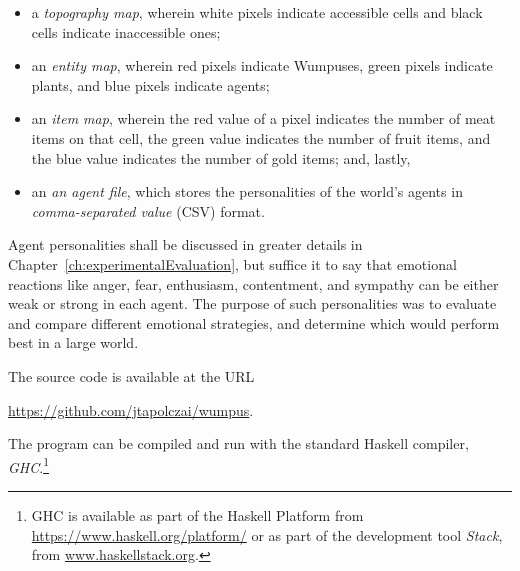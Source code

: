 \begin{itemize}
	\item a \emph{topography map}, wherein white pixels indicate accessible cells and black cells indicate inaccessible ones;
	\item an \emph{entity map}, wherein red pixels indicate Wumpuses, green pixels indicate plants, and blue pixels indicate agents;
	\item an \emph{item map}, wherein the red value of a pixel indicates the number of meat items on that cell, the green value indicates the number of fruit items, and the blue value indicates the number of gold items; and, lastly,
	\item an \emph{an agent file}, which stores the personalities of the world's agents in \emph{comma-separated value} (CSV) format.
\end{itemize}

Agent personalities shall be discussed in greater details in Chapter~\ref{ch:experimentalEvaluation}, but suffice it to say that emotional reactions like anger, fear, enthusiasm, contentment, and sympathy can be either weak or strong in each agent. The purpose of such personalities was to evaluate and compare different emotional strategies, and determine which would perform best in a large world.

The source code is available at the URL
\begin{center}
	\url{https://github.com/jtapolczai/wumpus}.
\end{center}
The program can be compiled and run with the standard Haskell compiler, \emph{GHC}.\footnote{GHC is available as part of the Haskell Platform from \url{https://www.haskell.org/platform/} or as part of the development tool \emph{Stack}, from \url{www.haskellstack.org}.}

